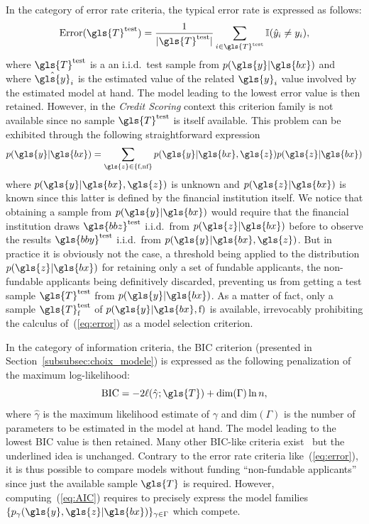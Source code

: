 In the category of error rate criteria, the typical error rate is expressed as follows:
\begin{equation} \label{eq:error}
\mbox{Error}(\gls{T}^\text{test}) = \frac{1}{|\gls{T}^\text{test}|} \sum_{i \in \gls{T}^\text{test}} \mathbb{I}(\hat y_i \neq y_i),
\end{equation} 
where $\gls{T}^\text{test}$ is a an i.i.d.\ test sample from $p(\gls{y}|\gls{bx})$ and where $\hat{\gls{y}}_i$ is the estimated value of the related $\gls{y}_i$ value involved by the estimated model at hand. The model leading to the lowest error value is then retained. However, in the \textit{Credit Scoring} context this criterion family is not available since no sample $\gls{T}^\text{test}$ is itself available. This problem can be exhibited through the following straightforward expression
\begin{equation} \label{eq:error2}
p(\gls{y}|\gls{bx}) = \sum_{\gls{z}\in\{\text{f},\text{nf}\}} p(\gls{y}|\gls{bx},\gls{z}) p(\gls{z}|\gls{bx})
\end{equation}
where $p(\gls{y}|\gls{bx},\gls{z})$ is unknown and $p(\gls{z}|\gls{bx})$ is known since this latter is defined by the financial institution itself. We notice that obtaining a sample from $p(\gls{y}|\gls{bx})$ would require that the financial institution draws $\gls{bbz}^\text{test}$ i.i.d.\ from $p(\gls{z}|\gls{bx})$ before to observe the results $\gls{bby}^\text{test}$ i.i.d.\ from $p(\gls{y}|\gls{bx},\gls{z})$. But in practice it is obviously not the case, a threshold being applied to the distribution $p(\gls{z}|\gls{bx})$ for retaining only a set of fundable applicants, the non-fundable applicants being definitively discarded, preventing us from getting a test sample $\gls{T}^\text{test}$ from $p(\gls{y} | \gls{bx})$. As a matter of fact, only a sample $\gls{T}^\text{test}_{\text{f}}$ of $p(\gls{y}|\gls{bx},\text{f})$ is available, 
irrevocably prohibiting the calculus of~(\ref{eq:error}) as a model selection criterion.

In the category of information criteria, the BIC criterion (presented in Section~\ref{subsubsec:choix_modele}) is expressed as the following penalization of the maximum log-likelihood:
\begin{equation}\label{eq:AIC}
\mbox{BIC} = - 2 \ell(\hat\gamma;\gls{T}) + \text{dim}(\Gamma) \ln n,
\end{equation}
where $\hat\gamma$ is the maximum likelihood estimate of $\gamma$ and $\text{dim}(\Gamma)$ is the number of parameters to be estimated in the model at hand. The model leading to the lowest BIC value is then retained. Many other BIC-like criteria exist~\cite{vandewalle:tel-00447141} but the underlined idea is unchanged. Contrary to the error rate criteria like~(\ref{eq:error}), it is thus possible to compare models without funding ``non-fundable applicants'' since just the available sample $\gls{T}$ is required. However, computing~(\ref{eq:AIC}) requires to precisely express the model families $\{p_{\gamma}(\gls{y},\gls{z}|\gls{bx})\}_{\gamma \in \Gamma}$ which compete.

